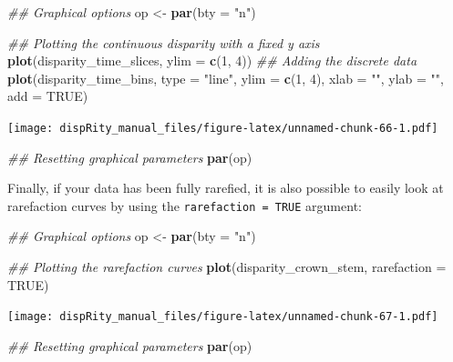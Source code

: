 \documentclass[]{book}
\newenvironment{Shaded}{\begin{snugshade}}{\end{snugshade}}
\newcommand{\CommentTok}[1]{\textcolor[rgb]{0.56,0.35,0.01}{\textit{#1}}}
\newcommand{\DataTypeTok}[1]{\textcolor[rgb]{0.13,0.29,0.53}{#1}}
\newcommand{\DecValTok}[1]{\textcolor[rgb]{0.00,0.00,0.81}{#1}}
\newcommand{\KeywordTok}[1]{\textcolor[rgb]{0.13,0.29,0.53}{\textbf{#1}}}
\newcommand{\NormalTok}[1]{#1}
\newcommand{\OtherTok}[1]{\textcolor[rgb]{0.56,0.35,0.01}{#1}}
\newcommand{\StringTok}[1]{\textcolor[rgb]{0.31,0.60,0.02}{#1}}
\begin{document}
\begin{Shaded}
\begin{Highlighting}[]
\CommentTok{## Graphical options}
\NormalTok{op <-}\StringTok{ }\KeywordTok{par}\NormalTok{(}\DataTypeTok{bty =} \StringTok{"n"}\NormalTok{)}

\CommentTok{## Plotting the continuous disparity with a fixed y axis}
\KeywordTok{plot}\NormalTok{(disparity_time_slices, }\DataTypeTok{ylim =} \KeywordTok{c}\NormalTok{(}\DecValTok{1}\NormalTok{, }\DecValTok{4}\NormalTok{))}
\CommentTok{## Adding the discrete data}
\KeywordTok{plot}\NormalTok{(disparity_time_bins, }\DataTypeTok{type =} \StringTok{"line"}\NormalTok{, }\DataTypeTok{ylim =} \KeywordTok{c}\NormalTok{(}\DecValTok{1}\NormalTok{, }\DecValTok{4}\NormalTok{),}
     \DataTypeTok{xlab =} \StringTok{""}\NormalTok{, }\DataTypeTok{ylab =} \StringTok{""}\NormalTok{, }\DataTypeTok{add =} \OtherTok{TRUE}\NormalTok{)}
\end{Highlighting}
\end{Shaded}

\texttt{[image: dispRity\_manual\_files/figure-latex/unnamed-chunk-66-1.pdf]}

\begin{Shaded}
\begin{Highlighting}[]
\CommentTok{## Resetting graphical parameters}
\KeywordTok{par}\NormalTok{(op)}
\end{Highlighting}
\end{Shaded}

Finally, if your data has been fully rarefied, it is also possible to easily look at rarefaction curves by using the \texttt{rarefaction\ =\ TRUE} argument:

\begin{Shaded}
\begin{Highlighting}[]
\CommentTok{## Graphical options}
\NormalTok{op <-}\StringTok{ }\KeywordTok{par}\NormalTok{(}\DataTypeTok{bty =} \StringTok{"n"}\NormalTok{)}

\CommentTok{## Plotting the rarefaction curves}
\KeywordTok{plot}\NormalTok{(disparity_crown_stem, }\DataTypeTok{rarefaction =} \OtherTok{TRUE}\NormalTok{)}
\end{Highlighting}
\end{Shaded}

\texttt{[image: dispRity\_manual\_files/figure-latex/unnamed-chunk-67-1.pdf]}

\begin{Shaded}
\begin{Highlighting}[]
\CommentTok{## Resetting graphical parameters}
\KeywordTok{par}\NormalTok{(op)}
\end{Highlighting}
\end{Shaded}
\end{document}
